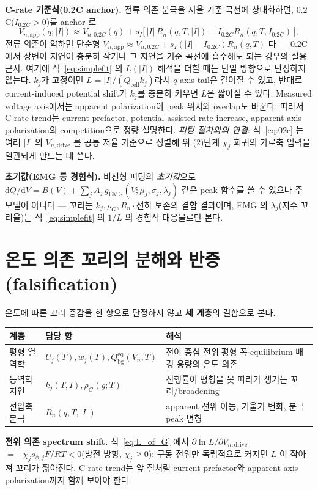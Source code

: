 \documentclass[11pt,a4paper]{article}
\newcommand{\dd}{\mathrm{d}}
\newcommand{\eq}{\mathrm{eq}}
\newcommand{\app}{\mathrm{app}}
\newcommand{\drive}{\mathrm{drive}}
\newcommand{\bg}{\mathrm{bg}}
\newcommand{\cell}{\mathrm{cell}}
\begin{document}
\textbf{C-rate 기준식(0.2C anchor).} 전류 의존 분극을 저율 기준 곡선에 상대화하면, $0.2$C($I_{0.2C}>0$)를 anchor 로
\begin{equation}
V_{n,\app}(q;|I|)\approx V_{n,0.2C}(q)+s_I\big[\,|I|\,R_n(q,T,|I|)-I_{0.2C}R_n(q,T,I_{0.2C})\,\big],
\label{eq:02c}
\end{equation}
전류 의존이 약하면 단순형 $V_{n,\app}\approx V_{n,0.2C}+s_I(|I|-I_{0.2C})R_n(q,T)$ 다 — $0.2$C 에서 상변이 지연이
충분히 작거나 그 지연을 기준 곡선에 흡수해도 되는 경우의 실용 근사. 여기에 식~\eqref{eq:simplefit} 의 $L(|I|)$ 해석을 더할 때는 단일 방향으로 단정하지 않는다.
$k_j$가 고정이면 $L=|I|/(Q_\cell k_j)$라서 $q$-axis tail은 길어질 수 있고, 반대로 current-induced potential shift가 $k_j$를 충분히 키우면 $L$은 짧아질 수 있다.
Measured voltage axis에서는 apparent polarization이 peak 위치와 overlap도 바꾼다. 따라서 C-rate trend는 current prefactor, potential-assisted rate increase, apparent-axis polarization의 competition으로 정량 설명한다.
\emph{피팅 절차와의 연결}: 식~\eqref{eq:02c} 는 여러 $|I|$ 의 $V_{n,\drive}$ 를 공통 저율 기준으로
정렬해 위 (2)단계 $\chi_j$ 회귀의 가로축 입력을 일관되게 만드는 데 쓴다.

\textbf{초기값(EMG 등 경험식).} 비선형 피팅의 \emph{초기값}으로 $\dd Q/\dd V=B(V)+\sum_j A_j\,g_\mathrm{EMG}
(V;\mu_j,\sigma_j,\lambda_j)$ 같은 peak 함수를 쓸 수 있으나 주 모델이 아니다 — 꼬리는 $k_j,\rho_G,R_n\cdot$전하
보존의 결합 결과이며, EMG 의 $\lambda_j$(지수 꼬리율)는 식~\eqref{eq:simplefit} 의 $1/L$ 의 경험적 대응물로만 본다.

\section{온도 의존 꼬리의 분해와 반증(falsification)}\label{sec:falsify}
온도에 따른 꼬리 증감을 한 항으로 단정하지 않고 \textbf{세 계층}의 결합으로 본다.
\begin{longtable}{p{} p{} p{}}
\toprule 계층 & 담당 항 & 해석 \\ \midrule \endhead
평형 열역학 & $U_j(T),w_j(T),Q_\bg^{\eq}(V_n,T)$ & 전이 중심 전위$\cdot$평형 폭$\cdot$equilibrium 배경 용량의 온도 의존 \\
동역학 지연 & $k_j(T,I),\rho_G(g;T)$ & 진행률이 평형을 못 따라가 생기는 꼬리/broadening \\
전압축 분극 & $R_n(q,T,|I|)$ & apparent 전위 이동, 기울기 변화, 분극 peak 변형 \\
\bottomrule
\end{longtable}
\textbf{전위 의존 spectrum shift.} 식~\eqref{eq:L_of_G} 에서 $\partial\ln L/\partial V_{n,\drive}$
$=-\chi_j s_{\phi,j}F/RT<0$(방전 방향, $\chi_j\ge0$): 구동 전위만 독립적으로 커지면 $L$ 이 작아져 꼬리가 짧아진다.
C-rate trend는 앞 절처럼 current prefactor와 apparent-axis polarization까지 함께 보아야 한다.
\end{document}
